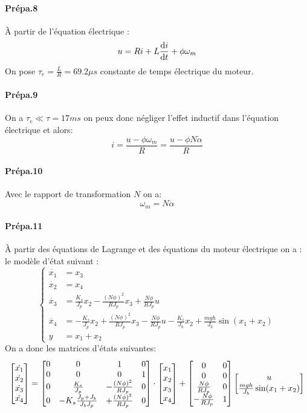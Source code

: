 \documentclass[10pt,a4paper,notitlepage]{article}
\begin{document}
\paragraph{Prépa.8}
À partir de l'équation électrique :
\[
  u =Ri + L \deriv[i]{t} + \phi \omega_m
\]
On  pose $\tau_e = \frac{L}{R} = 69.2 \mu s$  constante de temps électrique du moteur.
\paragraph{Prépa.9}On a $\tau_e \ll \tau =17 ms$ on peux donc négliger l'effet inductif dans l'équation électrique et alors:
\[
  i = \frac{u -\phi \omega_m}{R} = \frac{u-\phi N \dot{\alpha}}{R}
\]

\paragraph{Prépa.10} Avec le rapport de transformation $N$ on a:
\[
  \omega_m  = N \dot{\alpha}
\]
\paragraph{Prépa.11}
À partir des équations de Lagrange et des équations du moteur électrique on a : le modèle d'état suivant :
\[
  \begin{cases}
    \dot{x_1} &= x_3\\
    \dot{x_2} &= x_4 \\
    \dot{x_3} &= \frac{K_s}{J_p}x_2- \frac{(N\phi)^2}{RJ_p}x_3+ \frac{N\phi}{RJ_p} u \\
    \dot{x_4} &= -\frac{K_s}{J_p}x_2+ \frac{(N\phi)^2}{RJ_p}x_3- \frac{N\phi}{RJ_p}u -\frac{K_s}{J_b} x_2 +\frac{mgh}{J_b}\sin(x_1+x_2) \\
    y &= x_1+x_2
  \end{cases}
\]
On a donc les matrices d'états suivantes:
\[
  \vect{\dot{x_1} \\ \dot{x_2}\\ \dot{x_3}\\ \dot{x_4}}=
  \begin{bmatrix}
    0 & 0                         & 1                    & 0 \\
    0 & 0                         & 0                    & 1 \\
    0 & \frac{K_s}{J_p}           & -\frac{(N\phi)^2}{RJ_p} & 0 \\
    0 & - K_s\frac{J_p+J_b}{J_bJ_p} & +\frac{(N\phi)^2}{RJ_p} & 0
  \end{bmatrix}
  \cdot\vect{x_1 \\x_2\\x_3 \\x_4}
  +
  \begin{bmatrix}
    0                & 0\\
    0                & 0\\
    \frac{N\phi}{RJ_p}  & 0\\
    -\frac{N\phi}{RJ_p} & 1\\
  \end{bmatrix}
  \vect{u   \\ \frac{mgh}{J_b}\sin(x_1+x_2)}
\]
\end{document}
